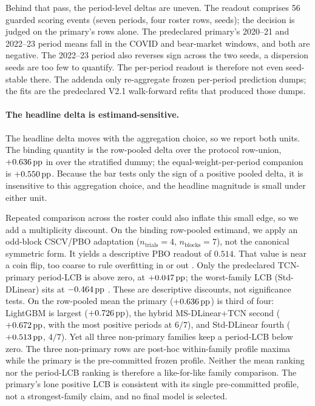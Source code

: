 Behind that pass, the period-level deltas are uneven. The readout comprises 56
guarded scoring events (seven periods, four roster rows, \numseeds{} seeds); the
decision is judged on the primary's rows alone. The predeclared primary's
2020--21 and 2022--23 period means fall in the COVID and bear-market windows, and
both are negative. The 2022--23 period also reverses sign across the two seeds, a
dispersion \numseeds{} seeds are too few to quantify. The per-period readout is
therefore not even seed-stable there. The addenda only re-aggregate frozen per-period
prediction dumps; the fits are the predeclared V2.1 walk-forward refits that
produced those dumps.

\paragraph{The headline delta is estimand-sensitive.}
The headline delta moves with the aggregation choice, so we report both units.
The binding quantity is the row-pooled delta over the protocol row-union,
\(+0.636\,\textrm{pp}\) in \macrofone{} over the stratified dummy; the
equal-weight-per-period companion is \(+0.550\,\textrm{pp}\). Because the bar tests only the
sign of a positive pooled delta, it is insensitive to this aggregation choice,
and the headline magnitude is small under either unit.

Repeated comparison across the roster could also inflate this small edge, so we
add a multiplicity discount. On the binding row-pooled estimand, we apply an
odd-block CSCV/PBO adaptation (\(n_{\text{trials}}{=}4\),
\(n_{\text{blocks}}{=}7\)), not the canonical symmetric form. It yields a
descriptive PBO readout of \(0.514\). That value is near a coin flip, too coarse to
rule overfitting in or out \cite{bailey2014pseudo,bailey2016probability}. Only the
predeclared TCN-primary period-LCB is above zero, at \(+0.047\,\textrm{pp}\); the
worst-family LCB (Std-DLinear) sits at \(-0.464\,\textrm{pp}\) \cite{harvey2016cross}. These are
descriptive discounts, not significance tests. On the row-pooled mean the primary
(\(+0.636\,\textrm{pp}\)) is third of four: LightGBM is largest (\(+0.726\,\textrm{pp}\)), the hybrid
MS-DLinear+TCN second (\(+0.672\,\textrm{pp}\), with the most positive periods at \(6/7\)),
and Std-DLinear fourth (\(+0.513\,\textrm{pp}\), \(4/7\)). Yet all three non-primary families
keep a period-LCB below zero. The three non-primary rows are post-hoc within-family
profile maxima while the primary is the pre-committed frozen profile. Neither the
mean ranking nor the period-LCB ranking is therefore a like-for-like family comparison.
The primary's lone positive LCB is consistent with its single pre-committed profile, not
a strongest-family claim, and no final model is selected.

